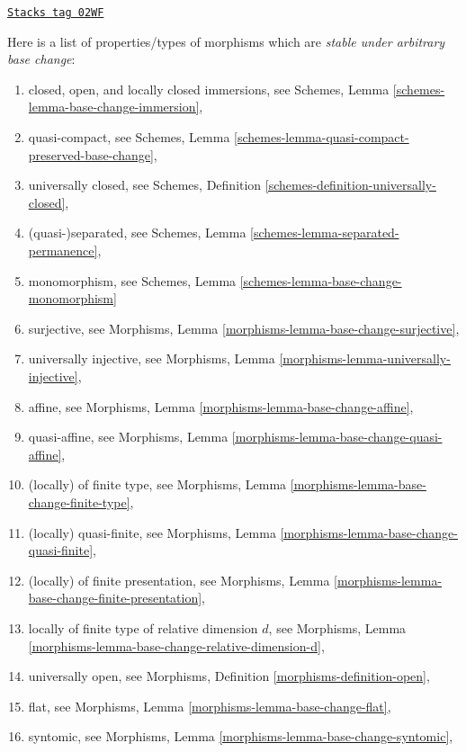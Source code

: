 \begin{remark}
\label{spaces-remark-list-properties-stable-base-change}
\href{https://stacks.math.columbia.edu/tag/02WF}{\texttt{Stacks tag 02WF}}

Here is a list of properties/types of morphisms
which are {\it stable under arbitrary base change}:
\begin{enumerate}
\item closed, open, and locally closed immersions, see
Schemes, Lemma \ref{schemes-lemma-base-change-immersion},
\item quasi-compact, see
Schemes, Lemma \ref{schemes-lemma-quasi-compact-preserved-base-change},
\item universally closed, see
Schemes, Definition \ref{schemes-definition-universally-closed},
\item (quasi-)separated, see
Schemes, Lemma \ref{schemes-lemma-separated-permanence},
\item monomorphism, see
Schemes, Lemma \ref{schemes-lemma-base-change-monomorphism}
\item surjective, see
Morphisms, Lemma \ref{morphisms-lemma-base-change-surjective},
\item universally injective, see
Morphisms, Lemma \ref{morphisms-lemma-universally-injective},
\item affine, see
Morphisms, Lemma \ref{morphisms-lemma-base-change-affine},
\item quasi-affine, see
Morphisms, Lemma \ref{morphisms-lemma-base-change-quasi-affine},
\item (locally) of finite type, see
Morphisms, Lemma \ref{morphisms-lemma-base-change-finite-type},
\item (locally) quasi-finite, see
Morphisms, Lemma \ref{morphisms-lemma-base-change-quasi-finite},
\item (locally) of finite presentation, see
Morphisms, Lemma \ref{morphisms-lemma-base-change-finite-presentation},
\item locally of finite type of relative dimension $d$, see
Morphisms, Lemma \ref{morphisms-lemma-base-change-relative-dimension-d},
\item universally open, see
Morphisms, Definition \ref{morphisms-definition-open},
\item flat, see
Morphisms, Lemma \ref{morphisms-lemma-base-change-flat},
\item syntomic, see
Morphisms, Lemma \ref{morphisms-lemma-base-change-syntomic},

\end{enumerate}
\end{remark}
